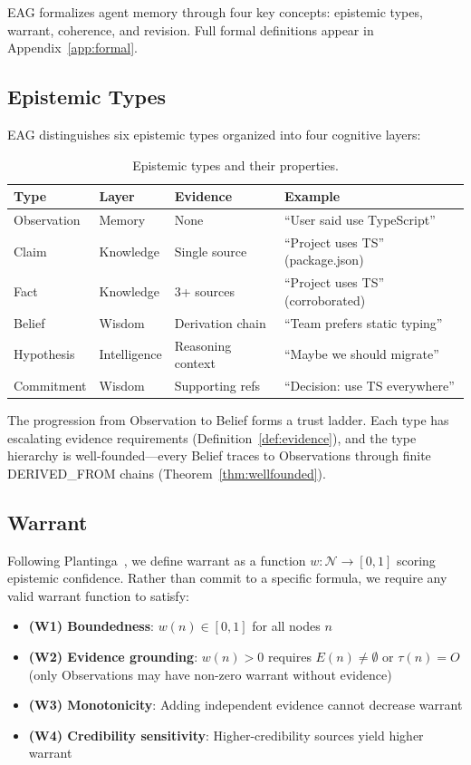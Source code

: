 \documentclass[11pt,a4paper]{article}
\begin{document}
EAG formalizes agent memory through four key concepts: epistemic types, warrant, coherence, and revision. Full formal definitions appear in Appendix~\ref{app:formal}.

\subsection{Epistemic Types}

EAG distinguishes six epistemic types organized into four cognitive layers:

\begin{table}[H]
\centering
\caption{Epistemic types and their properties.}
\label{tab:types}
\begin{tabular}{@{}lllp{4cm}@{}}
\toprule
\textbf{Type} & \textbf{Layer} & \textbf{Evidence} & \textbf{Example} \\
\midrule
Observation & Memory & None & ``User said use TypeScript'' \\
Claim & Knowledge & Single source & ``Project uses TS'' (package.json) \\
Fact & Knowledge & 3+ sources & ``Project uses TS'' (corroborated) \\
Belief & Wisdom & Derivation chain & ``Team prefers static typing'' \\
Hypothesis & Intelligence & Reasoning context & ``Maybe we should migrate'' \\
Commitment & Wisdom & Supporting refs & ``Decision: use TS everywhere'' \\
\bottomrule
\end{tabular}
\end{table}

The progression from Observation to Belief forms a trust ladder. Each type has escalating evidence requirements (Definition~\ref{def:evidence}), and the type hierarchy is well-founded---every Belief traces to Observations through finite DERIVED\_FROM chains (Theorem~\ref{thm:wellfounded}).

\subsection{Warrant}

Following Plantinga~\cite{plantinga1993}, we define warrant as a function $w: \mathcal{N} \to [0,1]$ scoring epistemic confidence. Rather than commit to a specific formula, we require any valid warrant function to satisfy:

\begin{itemize}[noitemsep]
    \item \textbf{(W1) Boundedness}: $w(n) \in [0,1]$ for all nodes $n$
    \item \textbf{(W2) Evidence grounding}: $w(n) > 0$ requires $E(n) \neq \emptyset$ or $\tau(n) = O$ (only Observations may have non-zero warrant without evidence)
    \item \textbf{(W3) Monotonicity}: Adding independent evidence cannot decrease warrant
    \item \textbf{(W4) Credibility sensitivity}: Higher-credibility sources yield higher warrant
\end{itemize}
\end{document}
